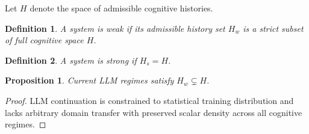 \documentclass[12pt]{article}
\newtheorem{proposition}{Proposition}
\newtheorem{definition}{Definition}
\begin{document}
Let $H$ denote the space of admissible cognitive histories.

\begin{definition}
A system is weak if its admissible history set $H_w$ is a strict subset of full cognitive space $H$.
\end{definition}

\begin{definition}
A system is strong if $H_s = H$.
\end{definition}

\begin{proposition}
Current LLM regimes satisfy $H_w \subsetneq H$.
\end{proposition}

\begin{proof}
LLM continuation is constrained to statistical training distribution and lacks arbitrary domain transfer with preserved scalar density across all cognitive regimes.
\end{proof}

\newpage
\end{document}
